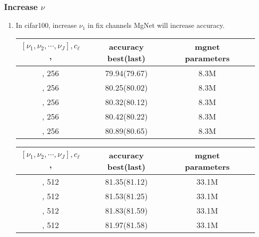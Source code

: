 \subsubsection{Increase $\nu$}
\begin{enumerate}
\item In cifar100, increase $\nu_1$ in fix channels MgNet will increase accuracy.
\begin{table}[!htbp]
	\begin{center}
			\begin{tabular}{|c|c|c|c|}
				\hline
				$[\nu_1,\nu_2,\cdots,\nu_J], c_\ell$,  &  accuracy  best(last) & mgnet parameters \tabularnewline
				\hline
				[2,2,2,2], 256                         &  79.94(79.67)         & 8.3M             \tabularnewline
				\hline		
				[4,2,2,2], 256                         &  80.25(80.02)         & 8.3M             \tabularnewline
				\hline
				[8,2,2,2], 256                         &  80.32(80.12)         & 8.3M             \tabularnewline
				\hline
				[16,2,2,2], 256                        &  80.42(80.22)         & 8.3M             \tabularnewline
				\hline
				[32,2,2,2], 256                        &  80.89(80.65)         & 8.3M             \tabularnewline
				\hline
			\end{tabular}
	\end{center}
\end{table}


\begin{table}[!htbp]
	\begin{center}
			\begin{tabular}{|c|c|c|c|}
				\hline
				$[\nu_1,\nu_2,\cdots,\nu_J], c_\ell$,  &   accuracy  best(last) & mgnet parameters \tabularnewline
				\hline
				[2,2,2,2], 512                         &   81.35(81.12)         & 33.1M            \tabularnewline
				\hline
				[4,2,2,2], 512                         &   81.53(81.25)         & 33.1M            \tabularnewline
				\hline
				[8,2,2,2], 512                         &   81.83(81.59)         & 33.1M            \tabularnewline
				\hline
				[16,2,2,2], 512                        &   81.97(81.58)         & 33.1M            \tabularnewline
				\hline
			\end{tabular}
	\end{center}
\end{table}


\end{enumerate}
